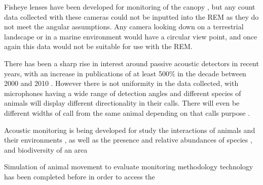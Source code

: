 Fisheye lenses have been developed for monitoring of the canopy \citep{brusa2014increasing}, but any count data collected with these cameras could not be inputted into the REM as they do not meet the angular assumptions. Any camera looking down on a terrestrial landscape or in a marine environment would have a circular view point, and once again this data would not be suitable for use with the REM. 

There has been a sharp rise in interest around passive acoustic detectors in recent years, with an increase in publications of at least 500\% in the decade between 2000 and 2010 \citep{kessel2014review}. However there is not uniformity in the data collected, with microphones having a wide range of detection angles and different species of animals will display different directionality in their calls. There will even be different widths of call from the same animal depending on that calls purpose \citep{jakobsen2012convergent}.

Acoustic monitoring is being developed for study the interactions of animals and their environments \citep{blumstein2011acoustic, straight2014passive, marcoux2011local, rogers2013density}, as well as the presence and relative abundances of species \citep{mckown2012wireless, marcoux2011local}, and biodiversity of an area \citep{ depraetere2012monitoring}

Simulation of animal movement to evaluate monitoring methodology technology has been completed before \citep{ivan2013using, rees2011testing} in order to access the 

